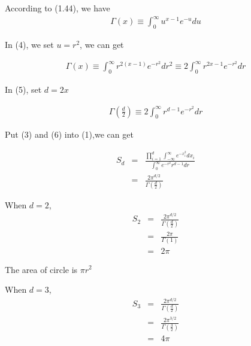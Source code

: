 \documentclass{article} %
\begin{document}
According to (1.44),  we have
\begin{equation}
    \begin{array}{rcl}
      	\Gamma(x) \equiv \int_{0}^{\infty}u^{x-1}e^{-u} du
    \end{array}
\end{equation}

In (4), we set $u = r^2$, we can get

\begin{equation}
    \begin{array}{rcl}
      	\Gamma(x) \equiv \int_{0}^{\infty}r^{2(x-1)}e^{-r^2} dr^2 \equiv 2\int_{0}^{\infty}r^{2x-1}e^{-r^2} dr
    \end{array}
\end{equation}

In (5), set $d= 2x$

\begin{equation}
    \begin{array}{rcl}
      	\Gamma(\frac{d}{2})  \equiv 2\int_{0}^{\infty}r^{d-1}e^{-r^2} dr
    \end{array}
\end{equation}

Put (3) and (6) into (1),we can get

\begin{equation}
    \begin{array}{rcl}
     	S_d  & = & \frac{\prod\limits_{i = 1}^{d}\int_{-\infty}^{\infty}e^{-x_i^2} d x_i}{\int_{0}^{\infty}e^{-r^2}r^{d-1}dr} \\
	& = & \frac{2\pi^{d/2}}{\Gamma(\frac{d}{2})}
    \end{array}
\end{equation}

When $d = 2$,
\begin{equation}
    \begin{array}{rcl}
     	S_2  & = & \frac{2\pi^{d/2}}{\Gamma(\frac{d}{2})} \\
	& = & \frac{2\pi}{\Gamma(1)} \\
	& = & 2\pi
    \end{array}
\end{equation}

The area of circle is $\pi r ^ 2$

When $d = 3$,
\begin{equation}
    \begin{array}{rcl}
     	S_3  & = & \frac{2\pi^{d/2}}{\Gamma(\frac{d}{2})} \\
	& = & \frac{2\pi^{3/2}}{\Gamma(\frac{3}{2})} \\
	& = & 4\pi
    \end{array}
\end{equation}
\end{document}
